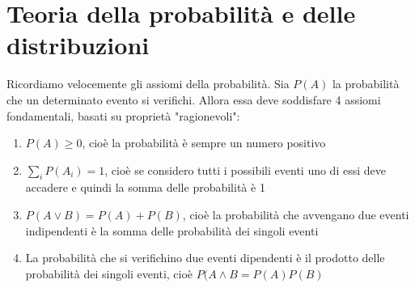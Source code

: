 \documentclass{article}
\begin{document}
\section{Teoria della probabilità e delle distribuzioni}
Ricordiamo velocemente gli assiomi della probabilità. Sia $P(A)$ la probabilità che un determinato evento si verifichi. Allora essa deve soddisfare 4 assiomi fondamentali, basati su proprietà "ragionevoli":
\begin{enumerate}
    \item $P(A)\geq 0$, cioè la probabilità è sempre un numero positivo
    \item $\sum_i P(A_i)=1$, cioè  se considero tutti i possibili eventi uno di essi deve accadere e quindi la somma delle probabilità è 1
    \item $P(A\vee B)=P(A)+P(B)$, cioè la probabilità che avvengano due eventi indipendenti è la somma delle probabilità dei singoli eventi
    \item La probabilità che si verifichino due eventi dipendenti è il prodotto delle probabilità dei singoli eventi, cioè $P(A \wedge B=P(A)P(B)$
\end{enumerate}
\end{document}
